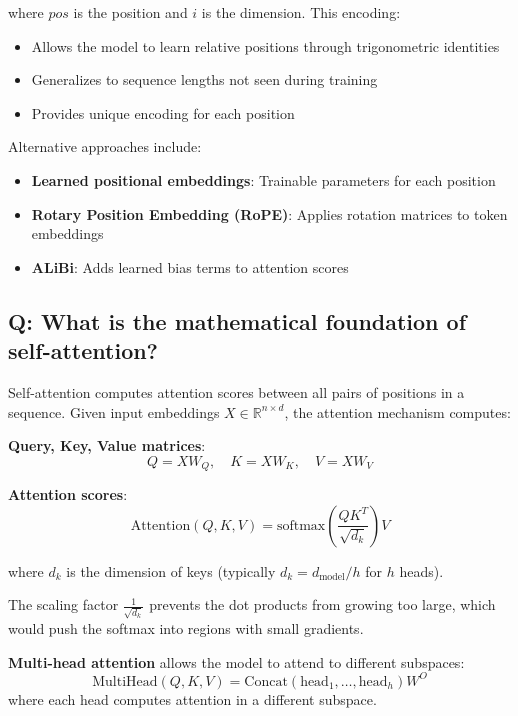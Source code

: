 where \(pos\) is the position and \(i\) is the dimension. This encoding:
\begin{itemize}
	\item Allows the model to learn relative positions through trigonometric identities
	\item Generalizes to sequence lengths not seen during training
	\item Provides unique encoding for each position
\end{itemize}

Alternative approaches include:
\begin{itemize}
	\item \textbf{Learned positional embeddings}: Trainable parameters for each position
	\item \textbf{Rotary Position Embedding (RoPE)}: Applies rotation matrices to token embeddings
	\item \textbf{ALiBi}: Adds learned bias terms to attention scores
\end{itemize}

\subsection*{Q: What is the mathematical foundation of self-attention?}
Self-attention computes attention scores between all pairs of positions in a sequence. Given input embeddings \(X \in \mathbb{R}^{n \times d}\), the attention mechanism computes:

\textbf{Query, Key, Value matrices}:
\[
Q = XW_Q, \quad K = XW_K, \quad V = XW_V
\]

\textbf{Attention scores}:
\[
\text{Attention}(Q, K, V) = \text{softmax}\left(\frac{QK^T}{\sqrt{d_k}}\right)V
\]

where \(d_k\) is the dimension of keys (typically \(d_k = d_{\text{model}}/h\) for \(h\) heads).

The scaling factor \(\frac{1}{\sqrt{d_k}}\) prevents the dot products from growing too large, which would push the softmax into regions with small gradients.

\textbf{Multi-head attention} allows the model to attend to different subspaces:
\[
\text{MultiHead}(Q, K, V) = \text{Concat}(\text{head}_1, \ldots, \text{head}_h)W^O
\]
where each head computes attention in a different subspace.

